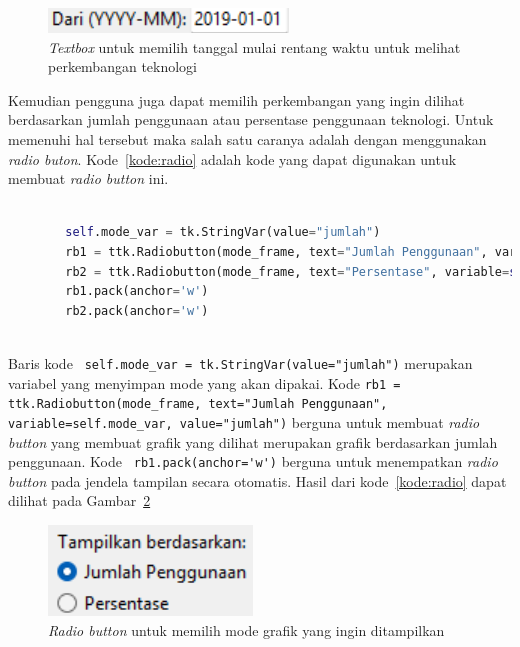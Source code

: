 \begin{figure}[H]
    \centering
    \includegraphics[width=0.25\linewidth]{Gambar/textbox.png}
    \caption{\textit{Textbox} untuk memilih tanggal mulai rentang waktu untuk melihat perkembangan teknologi}
    \label{fig:textbox}
\end{figure}

Kemudian pengguna juga dapat memilih perkembangan yang ingin dilihat berdasarkan jumlah penggunaan atau persentase penggunaan teknologi. Untuk memenuhi hal tersebut maka salah satu caranya adalah dengan menggunakan \textit{radio buton}. Kode~\ref{kode:radio} adalah kode yang dapat digunakan untuk membuat \textit{radio button} ini.

\begin{lstlisting}[language=Python, caption=Kode untuk menampilkan \textit{radio button} untuk memilih grafik yang dilihat, label=kode:radio]

        self.mode_var = tk.StringVar(value="jumlah")
        rb1 = ttk.Radiobutton(mode_frame, text="Jumlah Penggunaan", variable=self.mode_var, value="jumlah")
        rb2 = ttk.Radiobutton(mode_frame, text="Persentase", variable=self.mode_var, value="persentase")
        rb1.pack(anchor='w')
        rb2.pack(anchor='w')
    
\end{lstlisting}

Baris kode \verb| self.mode_var = tk.StringVar(value="jumlah")| merupakan variabel yang menyimpan mode yang akan dipakai. Kode \verb|rb1 = ttk.Radiobutton(mode_frame, text="Jumlah Penggunaan", variable=self.mode_var, value="jumlah")| berguna untuk membuat \textit{radio button} yang membuat grafik yang dilihat merupakan grafik berdasarkan jumlah penggunaan. Kode \verb| rb1.pack(anchor='w')| berguna untuk menempatkan \textit{radio button} pada jendela tampilan secara otomatis. Hasil dari kode~\ref{kode:radio} dapat dilihat pada Gambar~\ref{fig:radio}

\begin{figure}[H]
    \centering
    \includegraphics[width=0.25\linewidth]{Gambar/radio.png}
    \caption{\textit{Radio button} untuk memilih mode grafik yang ingin ditampilkan}
    \label{fig:radio}
\end{figure}

